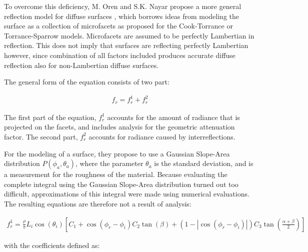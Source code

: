 To overcome this deficiency, M. Oren and S.K. Nayar propose a more general reflection model for diffuse surfaces \cite{OrenNayar} \cite{ImprovedDiffuse}, which borrows ideas from modeling the surface as a collection of microfacets as proposed for the Cook-Torrance or Torrance-Sparrow models. Microfacets are assumed to be perfectly Lambertian in reflection. This does not imply that surfaces are reflecting perfectly Lambertian however, since combination of all factors included produces accurate diffuse reflection also for non-Lambertian diffuse surfaces. 

The general form of the equation consists of two part:

	\begin{eqnarray*}
		f_r = f_r^1 + f_r^2
	\end{eqnarray*}

\noindent The first part of the equation, $f_r^1$ accounts for the amount of radiance that is projected on the facets, and includes analysis for the geometric attenuation factor. The second part, $f_r^2$ accounts for radiance caused by interreflections.


For the modeling of a surface, they propose to use a Gaussian Slope-Area distribution $P(\phi_a, \theta_a)$, where the parameter $\theta_a$ is the standard deviation, and is a measurement for the roughness of the material. Because evaluating the complete integral using the Gaussian Slope-Area distribution turned out too difficult, approximations of this integral were made using numerical evaluations. The resulting equations are therefore not a result of analysis:

	\begin{eqnarray*}
		f_r^1 = \frac{\rho}{\pi}L_i\cos(\theta_i)\left[C_1+\cos(\phi_r-\phi_i)C_2\tan(\beta) 
			  + (1-|\cos(\phi_r-\phi_i)|)C_3\tan\left(\frac{\alpha+\beta}{2}\right)\right]
	\end{eqnarray*}

\noindent with the coefficients defined as:

